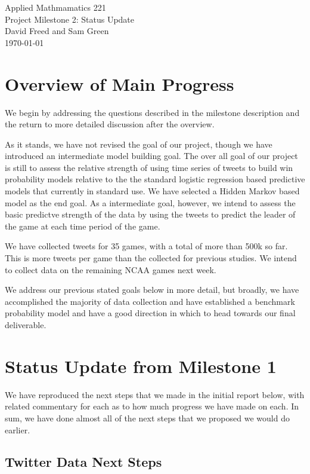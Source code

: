 \documentclass[12pt]{article}
\begin{document}
\begin{center}
{\Large Applied Mathmamatics 221}\\
Project Milestone 2: Status Update\\
David Freed and Sam Green\\
\today
\end{center}

\section*{Overview of Main Progress}

We begin by addressing the questions 
described in the milestone description
and the return to more detailed discussion
after the overview. 

As it stands, we have not revised the goal
of our project, though we have introduced
an intermediate model building goal. The over
all goal of our project is still to assess
the relative strength of using time series
of tweets to build win probability models
relative to the the standard logistic
regression based predictive models that
currently in standard use. We have selected
a Hidden Markov based model as the end goal.
As a intermediate goal, however, we intend
to assess the basic predictve 
strength of the data by using the tweets
to predict the leader of the game at each
time period of the game. 

We have collected tweets for 35 
games, with a total of more than 500k so
far. This is more tweets per game than
the collected for previous studies. We
intend to collect data on the remaining
NCAA games next week. 

We address our previous stated goals below
in more detail, but broadly, we have
accomplished the majority of data collection
and have established a benchmark probability
model and have a good direction in which
to head towards our final deliverable. 

\section*{Status Update from Milestone 1}

We have reproduced the next steps that we made in the initial report below, with related commentary for each as to how much progress we have made on each. In sum, we have done almost all of the next steps that we proposed we would do earlier. 

\subsection*{Twitter Data Next Steps}
\end{document}
